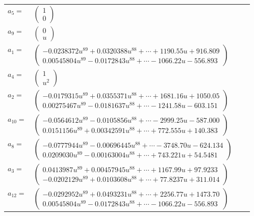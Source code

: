 \documentclass[1p]{elsarticle_modified}
\theoremstyle{definition}
\begin{document}
\begin{tabular}{m{7pt} m{180pt} m{7pt} m{180pt} }
\flushright $a_{5}=$&$\begin{pmatrix}1\\0\end{pmatrix}$ \\
\flushright $a_{9}=$&$\begin{pmatrix}0\\u\end{pmatrix}$ \\
\flushright $a_{1}=$&$\begin{pmatrix}-0.0238372 u^{89}+0.0320388 u^{88}+\cdots+1190.55 u+916.809\\0.00545804 u^{89}-0.0172843 u^{88}+\cdots-1066.22 u-556.893\end{pmatrix}$ \\
\flushright $a_{4}=$&$\begin{pmatrix}1\\u^2\end{pmatrix}$ \\
\flushright $a_{2}=$&$\begin{pmatrix}-0.0179315 u^{89}+0.0355371 u^{88}+\cdots+1681.16 u+1050.05\\0.00275467 u^{89}-0.0181637 u^{88}+\cdots-1241.58 u-603.151\end{pmatrix}$ \\
\flushright $a_{10}=$&$\begin{pmatrix}-0.0564612 u^{89}-0.0105856 u^{88}+\cdots-2999.25 u-587.000\\0.0151156 u^{89}+0.00342591 u^{88}+\cdots+772.555 u+140.383\end{pmatrix}$ \\
\flushright $a_{8}=$&$\begin{pmatrix}-0.0777944 u^{89}-0.00696445 u^{88}+\cdots-3748.70 u-624.134\\0.0209030 u^{89}-0.00163004 u^{88}+\cdots+743.221 u+54.5481\end{pmatrix}$ \\
\flushright $a_{3}=$&$\begin{pmatrix}0.0413987 u^{89}+0.00457945 u^{88}+\cdots+1167.99 u+97.9233\\-0.0202129 u^{89}+0.0103608 u^{88}+\cdots+77.8237 u+311.014\end{pmatrix}$ \\
\flushright $a_{12}=$&$\begin{pmatrix}-0.0292952 u^{89}+0.0493231 u^{88}+\cdots+2256.77 u+1473.70\\0.00545804 u^{89}-0.0172843 u^{88}+\cdots-1066.22 u-556.893\end{pmatrix}$ \\

\end{tabular}
\end{document}

